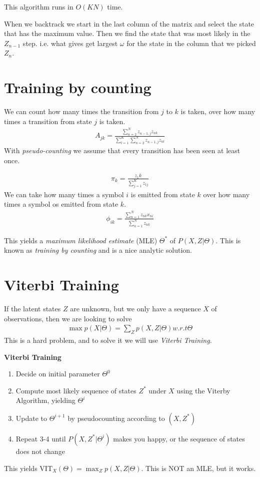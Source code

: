 \documentclass{article}
\begin{document}
    This algorithm runs in $O(KN)$ time.

    When we backtrack we start in the last column of the matrix and select the state that has the maximum value.
    Then we find the state that was most likely in the $Z_{n-1}$ step. i.e. what gives get largest $\omega$ for the state in the column that we picked $Z_{n}$.

\section{Training by counting}
  
  We can count how many times the transition from $j$ to $k$ is taken, over how many times a transition from state $j$ is taken.
  \begin{align}
    A_{jk} = \frac{
      \sum_{n=2}^{N}z_{n-1,j} z_{nk}
    }{
      \sum_{l=1}^{K}\sum_{n=2}^{N}{z_{n-1, j}z_{nl}}
    }
  \end{align}
  With \emph{pseudo-counting} we assume that every transition has been seen at least once.

  \begin{align}
    \pi_k = \frac{z_1k}{\sum_{j=1}^{K}{z_{1j}}}
  \end{align}
  We can take how many times a symbol $i$ is emitted from state $k$ over how many times a symbol os emitted from state $k$. 
  \begin{align}
    \phi_{ik} = \frac{
      \sum_{n=1}^{N}z_{nk}x_{ni}
    }{
      \sum_{n=1}^{N}{z_{nk}}
    }
  \end{align}

  This yields a \emph{maximum likelihood estimate} (MLE) $\Theta^*$ of $P(X, Z | \Theta)$. This is known as \emph{training by counting} and is a nice analytic solution.


  \section{Viterbi Training}

  If the latent states $Z$ are unknown, but we only have a sequence $X$ of observations, then we are looking to solve
  \begin{align}
    \max p(X |\Theta) = \sum_{Z}{p(X, Z | \Theta)} w.r.t \Theta
  \end{align}
  This is a hard problem, and to solve it we will use \emph{Viterbi Training.}

  \textbf{Viterbi Training}

  \begin{enumerate}
    \item Decide on initial parameter $\Theta^0$
    \item Compute most likely sequence of states $Z^*$ under $X$ using the Viterby Algorithm, yielding $\Theta^i$
    \item Update to $\Theta^{i+1}$ by pseudocounting according to $(X, Z^*)$
    \item Repeat 3-4 until $P(X, Z^* | \Theta^i)$ makes you happy, or the sequence of states does not change
  \end{enumerate}
  This yields $\text{VIT}_X(\Theta) = \max_{Z}p(X, Z | \Theta)$. This is NOT an MLE, but it works.
\end{document}
